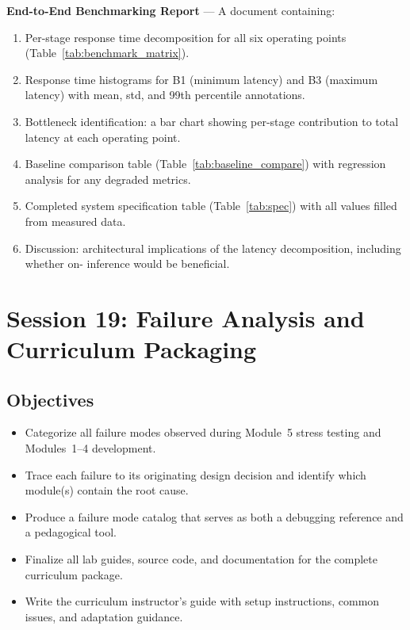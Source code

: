 \documentclass[11pt,letterpaper]{article}
\begin{document}
	\begin{tcolorbox}[deliverable={Session 18 Deliverable}]
		\textbf{End-to-End Benchmarking Report} --- A document containing:
		\begin{enumerate}
			\item Per-stage response time decomposition for all six operating points (Table~\ref{tab:benchmark_matrix}).
			\item Response time histograms for B1 (minimum latency) and B3 (maximum latency) with mean, std, and 99th percentile annotations.
			\item Bottleneck identification: a bar chart showing per-stage contribution to total latency at each operating point.
			\item Baseline comparison table (Table~\ref{tab:baseline_compare}) with regression analysis for any degraded metrics.
			\item Completed system specification table (Table~\ref{tab:spec}) with all values filled from measured data.
			\item Discussion: architectural implications of the latency decomposition, including whether on-\FPGA{} inference would be beneficial.
		\end{enumerate}
	\end{tcolorbox}

	\newpage
	\section{Session 19: Failure Analysis and Curriculum Packaging}
	\label{sec:failure}

	\subsection{Objectives}

	\begin{itemize}[leftmargin=2em]
		\item Categorize all failure modes observed during Module~5 stress testing and Modules~1--4 development.
		\item Trace each failure to its originating design decision and identify which module(s) contain the root cause.
		\item Produce a failure mode catalog that serves as both a debugging reference and a pedagogical tool.
		\item Finalize all lab guides, source code, and documentation for the complete curriculum package.
		\item Write the curriculum instructor's guide with setup instructions, common issues, and adaptation guidance.
	\end{itemize}
\end{document}
